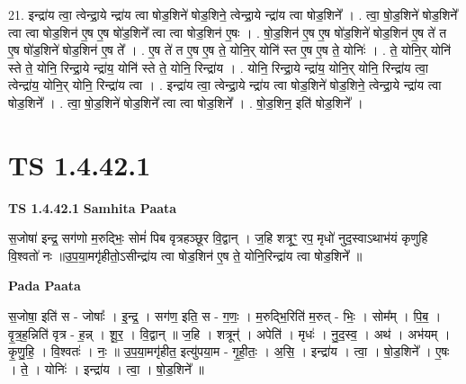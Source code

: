 \documentclass[17pt]{extarticle}
\begin{document}
21. इन्द्रा॑य त्वा॒ त्वेन्द्रा॒ये न्द्रा॑य त्वा षोड॒शिने॑ षोड॒शिने॒ त्वेन्द्रा॒ये न्द्रा॑य त्वा षोड॒शिने᳚ । . त्वा॒ षो॒ड॒शिने॑ षोड॒शिने᳚ त्वा त्वा षोड॒शिन॑ ए॒ष ए॒ष षो॑ड॒शिने᳚ त्वा त्वा षोड॒शिन॑ ए॒षः । . षो॒ड॒शिन॑ ए॒ष ए॒ष षो॑ड॒शिने॑ षोड॒शिन॑ ए॒ष ते॑ त ए॒ष षो॑ड॒शिने॑ षोड॒शिन॑ ए॒ष ते᳚ । . ए॒ष ते॑ त ए॒ष ए॒ष ते॒ योनि॒र् योनि॑ स्त ए॒ष ए॒ष ते॒ योनिः॑ । . ते॒ योनि॒र् योनि॑ स्ते ते॒ योनि॒ रिन्द्रा॒ये न्द्रा॑य॒ योनि॑ स्ते ते॒ योनि॒ रिन्द्रा॑य । . योनि॒ रिन्द्रा॒ये न्द्रा॑य॒ योनि॒र् योनि॒ रिन्द्रा॑य त्वा॒ त्वेन्द्रा॑य॒ योनि॒र् योनि॒ रिन्द्रा॑य त्वा । . इन्द्रा॑य त्वा॒ त्वेन्द्रा॒ये न्द्रा॑य त्वा षोड॒शिने॑ षोड॒शिने॒ त्वेन्द्रा॒ये न्द्रा॑य त्वा षोड॒शिने᳚ । . त्वा॒ षो॒ड॒शिने॑ षोड॒शिने᳚ त्वा त्वा षोड॒शिने᳚ । . षो॒ड॒शिन॒ इति॑ षोड॒शिने᳚ । \newline
\pagebreak
{}
\section*{ TS 1.4.42.1 }

\textbf{TS 1.4.42.1 } \newline
\textbf{Samhita Paata} \newline

स॒जोषा॑ इन्द्र॒ सग॑णो म॒रुद्भिः॒ सोमं॑ पिब वृत्रहञ्छूर वि॒द्वान् । ज॒हि शत्रूꣳ॒॒ रप॒ मृधो॑ नुद॒स्वाऽथाभ॑यं कृणुहि वि॒श्वतो॑ नः ॥उ॒प॒या॒मगृ॑हीतो॒ऽसीन्द्रा॑य त्वा षोड॒शिन॑ ए॒ष ते॒ योनि॒रिन्द्रा॑य त्वा षोड॒शिने᳚ ॥ \newline

\textbf{Pada Paata} \newline

स॒जोषा॒ इति॑ स - जोषाः᳚ । इ॒न्द्र॒ । सग॑ण॒ इति॒ स - ग॒णः॒ । म॒रुद्भि॒रिति॑ म॒रुत् - भिः॒ । सोम᳚म् । पि॒ब॒ । वृ॒त्र॒ह॒न्निति॑ वृत्र - ह॒न्न् । शू॒र॒ । वि॒द्वान् ॥ ज॒हि । शत्रून्॑ । अपेति॑ । मृधः॑ । नु॒द॒स्व॒ । अथ॑ । अभ॑यम् । कृ॒णु॒हि॒ । वि॒श्वतः॑ । नः॒ ॥ उ॒प॒या॒मगृ॑हीत॒ इत्यु॑पया॒म - गृ॒ही॒तः॒ । अ॒सि॒ । इन्द्रा॑य । त्वा॒ । षो॒ड॒शिने᳚ । ए॒षः । ते॒ । योनिः॑ । इन्द्रा॑य । त्वा॒ । षो॒ड॒शिने᳚ ॥  \newline
\end{document}

